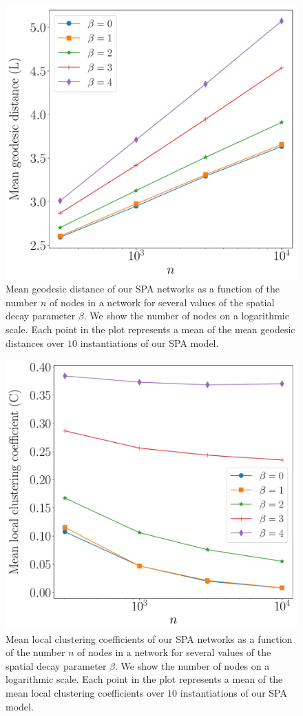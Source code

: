 \documentclass[%
 reprint,
 amsmath,amssymb,
 aps,
]{revtex4-1}
\begin{document}
\begin{figure}
    \centering
    \includegraphics[width=0.75\linewidth]{PA_log_geodesic.pdf}
    \caption{Mean geodesic distance of our SPA networks as a function of the number $n$ of nodes in a network for several values of the spatial decay parameter $\beta$. We show the number of nodes on a logarithmic scale. Each point in the plot represents a mean of the mean geodesic distances over $10$ instantiations of our SPA model.
    }
    \label{fig:PA_geodesic}
\end{figure}




\begin{figure}
    \centering
    \includegraphics[width=0.75\linewidth]{PA_log_clustering.pdf}
    \caption{Mean local clustering coefficients of our SPA networks as a function of the number $n$ of nodes in a network for several values of the spatial decay parameter $\beta$. We show the number of nodes on a logarithmic scale. Each point in the plot represents a mean of the mean local clustering coefficients over $10$ instantiations of our SPA model.
    }
    \label{fig:PA_clustering}
\end{figure}
\end{document}
